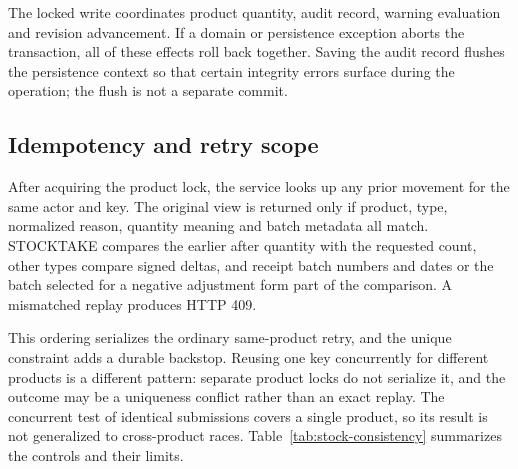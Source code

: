 The locked write coordinates product quantity, audit record, warning evaluation and revision advancement. If a domain or persistence exception aborts the transaction, all of these effects roll back together. Saving the audit record flushes the persistence context so that certain integrity errors surface during the operation; the flush is not a separate commit.


\subsection{Idempotency and retry scope}

After acquiring the product lock, the service looks up any prior movement for the same actor and key. The original view is returned only if product, type, normalized reason, quantity meaning and batch metadata all match. STOCKTAKE compares the earlier after quantity with the requested count, other types compare signed deltas, and receipt batch numbers and dates or the batch selected for a negative adjustment form part of the comparison. A mismatched replay produces HTTP 409.


This ordering serializes the ordinary same-product retry, and the unique constraint adds a durable backstop. Reusing one key concurrently for different products is a different pattern: separate product locks do not serialize it, and the outcome may be a uniqueness conflict rather than an exact replay. The concurrent test of identical submissions covers a single product, so its result is not generalized to cross-product races. Table~\ref{tab:stock-consistency} summarizes the controls and their limits.


